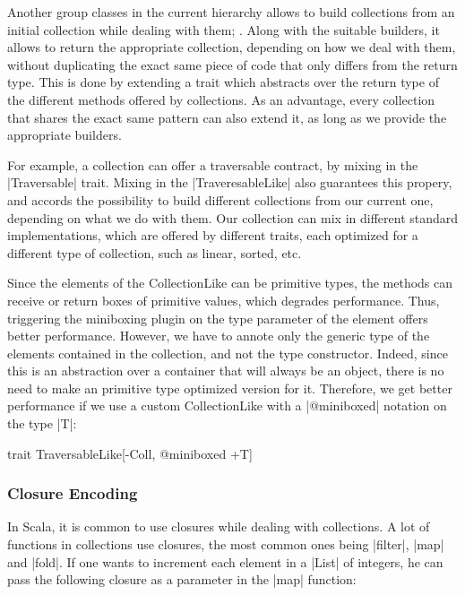 Another group classes in the current hierarchy allows to build collections from an initial collection while dealing with them; . Along with the suitable builders, it allows to return the appropriate collection, depending on how we deal with them, without duplicating the exact same piece of code that only differs from the return type. This is done by extending a trait which abstracts over the return type of the different methods offered by collections. As an advantage, every collection that shares the exact same pattern can also extend it, as long as we provide the appropriate builders.

For example, a collection can offer a traversable contract, by mixing in the |Traversable| trait. Mixing in the |TraveresableLike| also guarantees this propery, and accords the possibility to build different collections from our current one, depending on what we do with them. Our collection can mix in different standard implementations, which are offered by different traits, each optimized for a different type of collection, such as linear, sorted, etc.

Since the elements of the CollectionLike can be primitive types, the methods can receive or return boxes of primitive values, which degrades performance. Thus, triggering the miniboxing plugin on the type parameter of the element offers better performance. However, we have to annote only the generic type of the elements contained in the collection, and not the type constructor. Indeed, since this is an abstraction over a container that will always be an object, there is no need to make an primitive type optimized version for it. Therefore, we get better performance if we use a custom CollectionLike with a |@miniboxed| notation on the type |T|:

\begin{lstlisting-nobreak}
 trait TraversableLike[-Coll, @miniboxed +T]
\end{lstlisting-nobreak}

\subsubsection{Closure Encoding}

In Scala, it is common to use closures while dealing with collections. A lot of functions in collections use closures, the most common ones being |filter|, |map| and |fold|. If one wants to increment each element in a |List| of integers, he can pass the following closure as a parameter in the |map| function:

